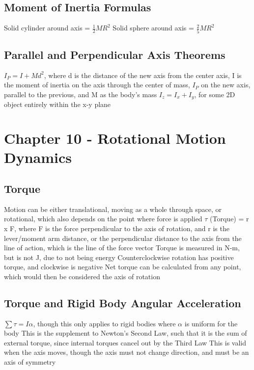 \documentclass[11 pt, twoside]{article}
\newenvironment{outline*}
{
	\begin{outline}[enumerate]
	}
	{\end{outline}
}
\begin{document}
\subsection{Moment of Inertia Formulas}
\begin{outline*}
\1 Solid cylinder around axis = $\frac{1}{2}MR^2$
\1 Solid sphere around axis = $\frac{2}{5}MR^2$
\end{outline*}
\subsection{Parallel and Perpendicular Axis Theorems}
\begin{outline*}
\1 $I_P = I + Md^2$, where d is the distance of the new axis from the center axis, I is the moment of inertia on the axis through the center of mass, $I_P$ on the new axis, parallel to the previous, and M as the body’s mass
\1 $I_z = I_x + I_y$, for some 2D object entirely within the x-y plane
\end{outline*}
\section{Chapter 10 - Rotational Motion Dynamics}
\subsection{Torque}
\begin{outline*}
\1 Motion can be either translational, moving as a whole through space, or rotational, which also depends on the point where force is applied
\1 $\tau$ (Torque) = r x F, where F is the force perpendicular to the axis of rotation, and r is the lever/moment arm distance, or the perpendicular distance to the axis from the line of action, which is the line of the force vector
\2 Torque is measured in N-m, but is not J, due to not being energy
\2 Counterclockwise rotation has positive torque, and clockwise is negative
\2 Net torque can be calculated from any point, which would then be considered the axis of rotation
\end{outline*}
\subsection{Torque and Rigid Body Angular Acceleration}
\begin{outline*}
\1 $\sum \tau = I\alpha$, though this only applies to rigid bodies where $\alpha$ is uniform for the body
\2 This is the supplement to Newton’s Second Law, such that it is the sum of external torque, since internal torques cancel out by the Third Law
\2 This is valid when the axis moves, though the axis must not change direction, and must be an axis of symmetry
\end{outline*}
\end{document}
